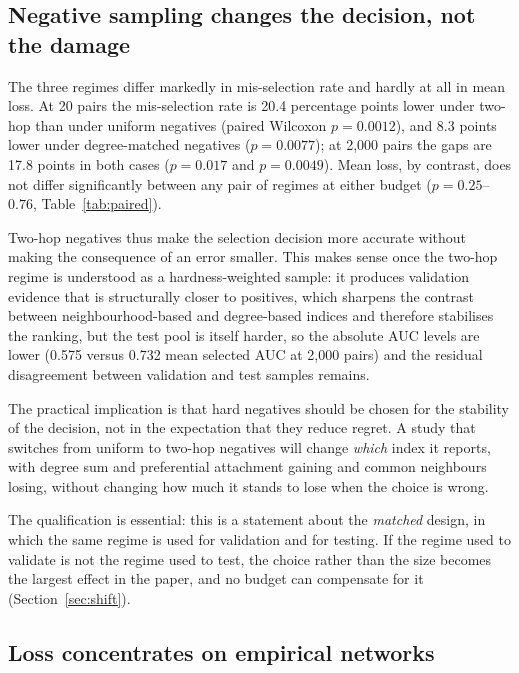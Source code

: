 \documentclass{comjnl}
\begin{document}
\subsection{Negative sampling changes the decision, not the damage}
\label{sec:regimes}

The three regimes differ markedly in mis-selection rate and hardly at all in mean loss. At 20 pairs the mis-selection rate is 20.4 percentage points lower under two-hop than under uniform negatives (paired Wilcoxon $p=0.0012$), and 8.3 points lower under degree-matched negatives ($p=0.0077$); at 2{,}000 pairs the gaps are 17.8 points in both cases ($p=0.017$ and $p=0.0049$). Mean loss, by contrast, does not differ significantly between any pair of regimes at either budget ($p=0.25$--$0.76$, Table~\ref{tab:paired}).

Two-hop negatives thus make the selection decision more accurate without making the consequence of an error smaller. This makes sense once the two-hop regime is understood as a hardness-weighted sample: it produces validation evidence that is structurally closer to positives, which sharpens the contrast between neighbourhood-based and degree-based indices and therefore stabilises the ranking, but the test pool is itself harder, so the absolute AUC levels are lower (0.575 versus 0.732 mean selected AUC at 2{,}000 pairs) and the residual disagreement between validation and test samples remains.

The practical implication is that hard negatives should be chosen for the stability of the decision, not in the expectation that they reduce regret. A study that switches from uniform to two-hop negatives will change \emph{which} index it reports, with degree sum and preferential attachment gaining and common neighbours losing, without changing how much it stands to lose when the choice is wrong.

The qualification is essential: this is a statement about the \emph{matched} design, in which the same regime is used for validation and for testing. If the regime used to validate is not the regime used to test, the choice rather than the size becomes the largest effect in the paper, and no budget can compensate for it (Section~\ref{sec:shift}).


\subsection{Loss concentrates on empirical networks}
\label{sec:family}
\end{document}
